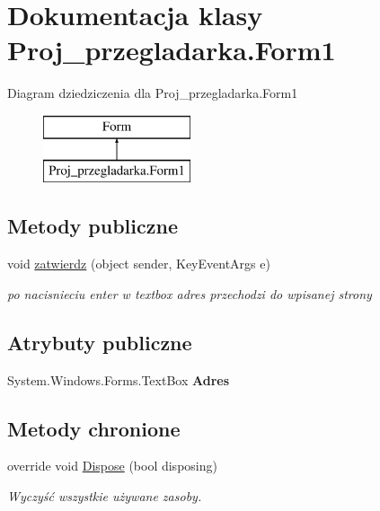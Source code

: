 \hypertarget{class_proj__przegladarka_1_1_form1}{}\section{Dokumentacja klasy Proj\+\_\+przegladarka.\+Form1}
\label{class_proj__przegladarka_1_1_form1}
Diagram dziedziczenia dla Proj\+\_\+przegladarka.\+Form1\begin{figure}[H]
\begin{center}
\leavevmode
\includegraphics[height=2.000000cm]{class_proj__przegladarka_1_1_form1}
\end{center}
\end{figure}
\subsection*{Metody publiczne}
\begin{DoxyCompactItemize}
\item 
void \mbox{\hyperlink{class_proj__przegladarka_1_1_form1_ab7bc6e39d4950b8e2e37c6e4f7c1a02f}{zatwierdz}} (object sender, Key\+Event\+Args e)
\begin{DoxyCompactList}\small\item\em po nacisnieciu enter w textbox adres przechodzi do wpisanej strony \end{DoxyCompactList}\end{DoxyCompactItemize}
\subsection*{Atrybuty publiczne}
\begin{DoxyCompactItemize}
\item 
\mbox{\label{class_proj__przegladarka_1_1_form1_af9d9862a07e36dab5fdb5bfe1a95366d}} 
System.\+Windows.\+Forms.\+Text\+Box {\bfseries Adres}
\end{DoxyCompactItemize}
\subsection*{Metody chronione}
\begin{DoxyCompactItemize}
\item 
override void \mbox{\hyperlink{class_proj__przegladarka_1_1_form1_a36c04a52ed870c6a1bdc93571d690dda}{Dispose}} (bool disposing)
\begin{DoxyCompactList}\small\item\em Wyczyść wszystkie używane zasoby. \end{DoxyCompactList}\end{DoxyCompactItemize}
